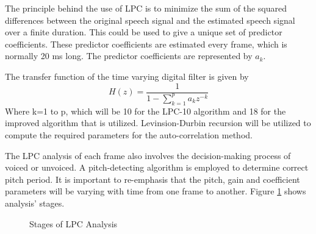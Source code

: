 \documentclass[12pt, a4paper, twoside]{report}
\begin{document}
The principle behind the use of LPC is to minimize the sum of the squared differences between the original speech signal and the estimated speech signal over a finite duration. This could be used to give a unique set of predictor coefficients. These predictor coefficients are estimated every frame, which is normally 20 ms long. The predictor coefficients are represented by $a_k$.

The transfer function of the time varying
digital filter is given by
\begin{equation}
H(z) = \frac{1}{1-\sum_{k=1}^{p} a_k z^{-k}}
\end{equation}
Where k=1 to p, which will be 10 for the LPC-10 algorithm and 18 for the improved algorithm that is utilized. Levinsion-Durbin recursion will be utilized to compute the required parameters for the auto-correlation method. 

The LPC analysis of each frame also involves the decision-making process of voiced or unvoiced. A pitch-detecting algorithm is employed to determine correct pitch period. It is
important to re-emphasis that the pitch, gain and coefficient parameters will be varying with time from one frame to another. Figure \ref{fig:lpc_analysis_stages} shows analysis' stages.

\begin{figure}[h!]
\centering
{}
\caption{Stages of LPC Analysis}
\label{fig:lpc_analysis_stages}
\end{figure}
\end{document}
